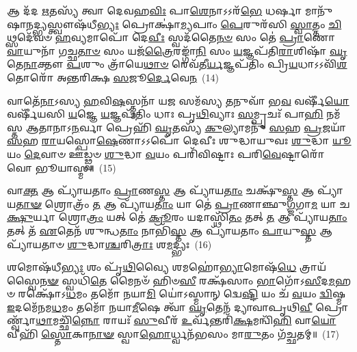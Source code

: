 {\anuvakamend[{𑌭𑌵᳴\-\ul{𑌤}\-𑌮𑍇𑌕᳴𑌤𑍍𑌰𑌿𑍞𑌶𑌚𑍍𑌚}]}%

𑌆 𑌦᳴𑌦 \ul{𑌋}\-𑌤𑌸𑍍𑌯᳴ 𑌤𑍍𑌵𑌾 𑌦𑍇𑌵𑌹\-\ul{𑌵𑌿𑌃} 𑌪𑌾\-\ul{𑌶𑍇}\-𑌨𑌾\-𑌽\-𑌽𑌰᳴\-\ul{𑌭𑍇} 𑌧𑌰𑍍\mbox{}\-\ul{𑌷𑌾} 𑌮𑌾𑌨𑍁᳴𑌷𑌾\-\ul{𑌨}\-𑌦𑍍𑌭𑍍𑌯𑌸𑍍𑌤𑍍𑌵𑍗𑌷᳴𑌧𑍀\-\ul{𑌭𑍍𑌯𑌃} 𑌪𑍍𑌰𑍋𑌕𑍍𑌷𑌾॑\-\ul{𑌮𑍍𑌯}\-𑌪𑌾𑌂 \ul{𑌪𑍇}\-𑌰𑍁𑌰᳴𑌸𑌿 \ul{𑌸𑍍𑌵𑌾}\-𑌤𑍍𑌤𑌂 \ul{𑌚𑌿}\-𑌥𑍍𑌸𑌦𑍇᳴𑌵𑍞 \ul{𑌹}\-𑌵𑍍𑌯𑌮𑌾𑌪𑍋᳴ 𑌦𑍇\-\ul{𑌵𑍀𑌃} 𑌸𑍍𑌵𑌦᳴𑌤𑍈\-\ul{𑌨}\-\-\ul{𑍞} 𑌸𑌂 𑌤𑍇॑ \ul{𑌪𑍍𑌰𑌾}\-𑌣𑍋 \ul{𑌵𑌾}\-𑌯𑍁𑌨𑌾᳴ 𑌗𑌚𑍍𑌛\-\ul{𑌤𑌾}\-\-\ul{𑍞} 𑌸𑌂 𑌯𑌜᳴\-\ul{𑌤𑍍𑌰𑍈}\-𑌰𑌙𑍍𑌗𑌾᳴\-\ul{𑌨𑌿} 𑌸𑌂 \ul{𑌯}\-𑌜𑍍𑌞𑌪᳴𑌤𑌿\-\ul{𑌰𑌾}\-𑌶𑌿𑌷𑌾᳴ \ul{𑌘𑍃}\-𑌤𑍇\-\ul{𑌨𑌾}\-𑌕𑍍𑌤𑍗 \ul{𑌪}\-𑌶𑍁𑌂 𑌤𑍍𑌰𑌾᳴𑌯𑍇\-\ul{𑌥𑌾}\-\-\ul{𑍞} 𑌰𑍇𑌵᳴𑌤𑍀\-\ul{𑌰𑍍𑌯}\-𑌜𑍍𑌞𑌪᳴𑌤𑌿𑌂 𑌪𑍍𑌰𑌿\-\ul{𑌯}\-𑌧𑌾\-𑌽\-𑌽𑌵𑌿᳴\-\ul{𑌶}\-𑌤𑍋𑌰𑍋᳴ 𑌅𑌨𑍍𑌤𑌰𑌿𑌕𑍍𑌷 \ul{𑌸}\-𑌜𑍂\-\ul{𑌰𑍍𑌦𑍇}\-𑌵𑍇\-\ul{𑌨}\-~(14)

𑌵𑌾𑌤𑍇᳴\-\ul{𑌨𑌾}\-\-𑌽𑌸𑍍𑌯 \ul{𑌹}\-𑌵𑌿\-\ul{𑌷}\-𑌸𑍍𑌤𑍍𑌮𑌨𑌾᳴ 𑌯\-\ul{𑌜} 𑌸𑌮᳴𑌸𑍍𑌯 \ul{𑌤}\-𑌨𑍁𑌵𑌾᳴ 𑌭\-\ul{𑌵} 𑌵𑌰𑍍\mbox{}𑌷𑍀᳴\-\ul{𑌯𑍋} 𑌵𑌰𑍍\mbox{}𑌷𑍀᳴𑌯𑌸𑌿 \ul{𑌯}\-𑌜𑍍𑌞𑍇 \ul{𑌯}\-𑌜𑍍𑌞𑌪᳴𑌤𑌿𑌂 𑌧𑌾𑌃 𑌪𑍃\-\ul{𑌥𑌿}\-𑌵𑍍𑌯𑌾𑌃 \ul{𑌸}\-𑌮𑍍𑌪𑍃𑌚𑌃᳴ 𑌪𑌾\-\ul{𑌹𑌿} 𑌨𑌮᳴𑌸𑍍𑌤 𑌆𑌤𑌾𑌨𑌾\-𑌽\-\ul{𑌨}\-𑌰𑍍𑌵𑌾 𑌪𑍍𑌰𑍇𑌹𑌿᳴ \ul{𑌘𑍃}\-𑌤𑌸𑍍𑌯᳴ \ul{𑌕𑍁}\-𑌲𑍍𑌯𑌾𑌮𑌨𑍁᳴ \ul{𑌸}\-𑌹 \ul{𑌪𑍍𑌰}\-𑌜𑌯𑌾᳴ \ul{𑌸}\-𑌹 \ul{𑌰𑌾}\-𑌯𑌸𑍍𑌪𑍋\-\ul{𑌷𑍇}\-𑌣𑌾\-𑌽\-𑌽𑌪𑍋᳴ 𑌦𑍇𑌵𑍀𑌃 𑌶𑍁𑌦𑍍𑌧𑌾𑌯𑍁𑌵𑌃 \ul{𑌶𑍁}\-𑌦𑍍𑌧𑌾 \ul{𑌯𑍂}\-𑌯𑌂 \ul{𑌦𑍇}\-𑌵𑌾𑍞 𑌊॑𑌡𑍍𑌢𑍍𑌵𑍞 \ul{𑌶𑍁}\-𑌦𑍍𑌧𑌾 \ul{𑌵}\-𑌯𑌂 𑌪𑌰𑌿᳴𑌵𑌿𑌷𑍍𑌟𑌾𑌃 𑌪𑌰𑌿\-\ul{𑌵𑍇}\-𑌷𑍍𑌟𑌾𑌰𑍋᳴ 𑌵𑍋 𑌭𑍂𑌯𑌾𑌸𑍍𑌮॥~(15)

{\anuvakamend[{\-\ul{𑌦𑍇}\-𑌵𑍇\-\ul{𑌨} 𑌚𑌤𑍁᳴𑌶𑍍𑌚𑌤𑍍𑌵𑌾𑌰𑌿𑍞𑌶𑌚𑍍𑌚}]}%

𑌵𑌾\-\ul{𑌕𑍍𑌤} 𑌆 𑌪𑍍𑌯𑌾᳴𑌯𑌤𑌾𑌂 \ul{𑌪𑍍𑌰𑌾}\-𑌣\-\ul{𑌸𑍍𑌤} 𑌆 𑌪𑍍𑌯𑌾᳴𑌯\-\ul{𑌤𑌾𑌂} 𑌚𑌕𑍍𑌷𑍁᳴\-\ul{𑌸𑍍𑌤} 𑌆 𑌪𑍍𑌯𑌾᳴𑌯\-\ul{𑌤𑌾}\-\-\ul{𑍟} 𑌶𑍍𑌰𑍋𑌤𑍍𑌰𑌂᳴ \ul{𑌤} 𑌆 𑌪𑍍𑌯𑌾᳴𑌯\-\ul{𑌤𑌾𑌂} 𑌯𑌾 𑌤𑍇॑ \ul{𑌪𑍍𑌰𑌾}\-𑌣𑌾𑌞𑍍𑌛𑍁\-\ul{𑌗𑍍𑌜}\-𑌗𑌾\-\ul{𑌮} 𑌯𑌾 𑌚\-\ul{𑌕𑍍𑌷𑍁}\-𑌰𑍍𑌯𑌾 𑌶𑍍𑌰𑍋\-\ul{𑌤𑍍𑌰𑌂} 𑌯𑌤𑍍 𑌤𑍇॑ \ul{𑌕𑍍𑌰𑍂}\-𑌰𑌂 𑌯𑌦𑌾𑌸𑍍𑌥𑌿᳴\-\ul{𑌤𑌂} 𑌤𑌤𑍍 \ul{𑌤} 𑌆 𑌪𑍍𑌯𑌾᳴𑌯\-\ul{𑌤𑌾𑌂} 𑌤𑌤𑍍 𑌤᳴ \ul{𑌏}\-𑌤𑍇𑌨᳴ 𑌶𑍁𑌨𑍍𑌧\-\ul{𑌤𑌾𑌂} 𑌨𑌾𑌭𑌿᳴\-\ul{𑌸𑍍𑌤} 𑌆 𑌪𑍍𑌯𑌾᳴𑌯𑌤𑌾𑌂 \ul{𑌪𑌾}\-𑌯𑍁\-\ul{𑌸𑍍𑌤} 𑌆 𑌪𑍍𑌯𑌾᳴𑌯𑌤𑌾𑍞 \ul{𑌶𑍁}\-𑌦𑍍𑌧𑌾\-\ul{𑌶𑍍𑌚}\-𑌰𑌿\-\ul{𑌤𑍍𑌰𑌾𑌃} 𑌶\-\ul{𑌮}\-𑌦𑍍𑌭𑍍𑌯𑌃~(16)

𑌶𑌮𑍋𑌷᳴𑌧𑍀\-\ul{𑌭𑍍𑌯𑌃} 𑌶𑌂 𑌪𑍃᳴\-\ul{𑌥𑌿}\-𑌵𑍍𑌯𑍈 𑌶𑌮𑌹𑍋॑\-\ul{𑌭𑍍𑌯𑌾}\-𑌮𑍋𑌷᳴\-\ul{𑌧𑍇} 𑌤𑍍𑌰𑌾𑌯᳴𑌸𑍍𑌵𑍈\-\ul{𑌨}\-\-\ul{𑍟} 𑌸𑍍𑌵𑌧𑌿᳴\-\ul{𑌤𑍇} 𑌮𑍈𑌨𑍞᳴ 𑌹𑌿𑍞\-\ul{𑌸𑍀} 𑌰𑌕𑍍𑌷᳴𑌸𑌾𑌂 \ul{𑌭𑌾}\-𑌗𑍋᳴\-𑌽\-\ul{𑌸𑍀}\-𑌦\-\ul{𑌮}\-𑌹𑍞 𑌰𑌕𑍍𑌷𑍋᳴\-𑌽\-\ul{𑌧}\-𑌮𑌂 𑌤𑌮𑍋᳴ 𑌨𑌯𑌾\-\ul{𑌮𑌿} 𑌯𑍋॑\-𑌽𑌸𑍍𑌮𑌾𑌨𑍍 𑌦𑍍𑌵𑍇\-\ul{𑌷𑍍𑌟𑌿} 𑌯𑌂 𑌚᳴ \ul{𑌵}\-𑌯𑌂 \ul{𑌦𑍍𑌵𑌿}\-𑌷𑍍𑌮 \ul{𑌇}\-𑌦𑌮𑍇᳴𑌨𑌮\-\ul{𑌧}\-𑌮𑌂 𑌤𑌮𑍋᳴ 𑌨𑌯𑌾\-\ul{𑌮𑍀}\-𑌷𑍇 𑌤𑍍𑌵𑌾᳴ \ul{𑌘𑍃}\-𑌤𑍇𑌨᳴ 𑌦𑍍𑌯𑌾𑌵𑌾𑌪𑍃𑌥𑌿\-\ul{𑌵𑍀} 𑌪𑍍𑌰𑍋𑌰𑍍𑌣𑍍𑌵𑌾᳴\-\ul{𑌥𑌾}\-𑌮𑌚𑍍𑌛𑌿᳴\-\ul{𑌨𑍍𑌨𑍋} 𑌰𑌾𑌯𑌃᳴ \ul{𑌸𑍁}\-𑌵𑍀𑌰᳴ \ul{𑌉}\-𑌰𑍍𑌵᳴𑌨𑍍𑌤𑌰𑌿᳴\-\ul{𑌕𑍍𑌷}\-𑌮𑌨𑍍𑌵𑌿᳴\-\ul{𑌹𑌿} 𑌵𑌾\-\ul{𑌯𑍋} 𑌵𑍀𑌹𑌿᳴ \ul{𑌸𑍍𑌤𑍋}\-𑌕𑌾\-\ul{𑌨𑌾}\-\-\ul{𑍟} 𑌸𑍍𑌵𑌾\-\ul{𑌹𑍋}\-𑌰𑍍𑌧𑍍𑌵𑌨᳴𑌭𑌸𑌂 𑌮𑌾\-\ul{𑌰𑍁}\-𑌤𑌂 𑌗᳴𑌚𑍍𑌛𑌤𑌮𑍍॥~(17)

{\anuvakamend[{\-\ul{𑌅}\-𑌦𑍍𑌭𑍍𑌯𑍋 𑌵𑍀\-\ul{𑌹𑌿} 𑌪𑌞𑍍𑌚᳴ 𑌚}]}%

